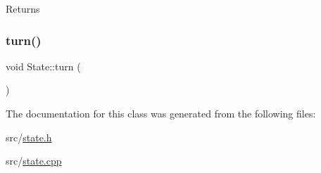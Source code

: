 \begin{DoxyReturn}{Returns}

\end{DoxyReturn}
\mbox{\label{class_state_ae5ed95e28512e11f7cc41c603ca58ad5}} 
\subsubsection{\texorpdfstring{turn()}{turn()}}
{\footnotesize\ttfamily void State\+::turn (\begin{DoxyParamCaption}{ }\end{DoxyParamCaption})}



The documentation for this class was generated from the following files\+:\begin{DoxyCompactItemize}
\item 
src/\mbox{\hyperlink{state_8h}{state.\+h}}\item 
src/\mbox{\hyperlink{state_8cpp}{state.\+cpp}}\end{DoxyCompactItemize}
